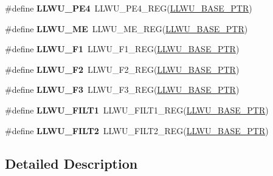 \begin{DoxyCompactItemize}
\mbox{\label{group___l_l_w_u___register___accessor___macros_gada12ddd62f9a667b60702dfd8b4f69ff}} 
\#define {\bfseries L\+L\+W\+U\+\_\+\+P\+E4}~L\+L\+W\+U\+\_\+\+P\+E4\+\_\+\+R\+EG(\hyperlink{group___l_l_w_u___peripheral_ga89c97b9e8756088cb3d8617c022ae6ac}{L\+L\+W\+U\+\_\+\+B\+A\+S\+E\+\_\+\+P\+TR})
\item 
\mbox{\label{group___l_l_w_u___register___accessor___macros_gabe3a2c1d3bd364f60d4ef36944dd0d7e}} 
\#define {\bfseries L\+L\+W\+U\+\_\+\+ME}~L\+L\+W\+U\+\_\+\+M\+E\+\_\+\+R\+EG(\hyperlink{group___l_l_w_u___peripheral_ga89c97b9e8756088cb3d8617c022ae6ac}{L\+L\+W\+U\+\_\+\+B\+A\+S\+E\+\_\+\+P\+TR})
\item 
\mbox{\label{group___l_l_w_u___register___accessor___macros_ga0b1034b705393cb19dc8bdc643242e0b}} 
\#define {\bfseries L\+L\+W\+U\+\_\+\+F1}~L\+L\+W\+U\+\_\+\+F1\+\_\+\+R\+EG(\hyperlink{group___l_l_w_u___peripheral_ga89c97b9e8756088cb3d8617c022ae6ac}{L\+L\+W\+U\+\_\+\+B\+A\+S\+E\+\_\+\+P\+TR})
\item 
\mbox{\label{group___l_l_w_u___register___accessor___macros_gaf234482694d2528fddefe57b14eaa942}} 
\#define {\bfseries L\+L\+W\+U\+\_\+\+F2}~L\+L\+W\+U\+\_\+\+F2\+\_\+\+R\+EG(\hyperlink{group___l_l_w_u___peripheral_ga89c97b9e8756088cb3d8617c022ae6ac}{L\+L\+W\+U\+\_\+\+B\+A\+S\+E\+\_\+\+P\+TR})
\item 
\mbox{\label{group___l_l_w_u___register___accessor___macros_gaaf3f95074e10d498b1522014ab7d5bfe}} 
\#define {\bfseries L\+L\+W\+U\+\_\+\+F3}~L\+L\+W\+U\+\_\+\+F3\+\_\+\+R\+EG(\hyperlink{group___l_l_w_u___peripheral_ga89c97b9e8756088cb3d8617c022ae6ac}{L\+L\+W\+U\+\_\+\+B\+A\+S\+E\+\_\+\+P\+TR})
\item 
\mbox{\label{group___l_l_w_u___register___accessor___macros_ga0ccd44a49b9f822b80e5d8c4935d94fe}} 
\#define {\bfseries L\+L\+W\+U\+\_\+\+F\+I\+L\+T1}~L\+L\+W\+U\+\_\+\+F\+I\+L\+T1\+\_\+\+R\+EG(\hyperlink{group___l_l_w_u___peripheral_ga89c97b9e8756088cb3d8617c022ae6ac}{L\+L\+W\+U\+\_\+\+B\+A\+S\+E\+\_\+\+P\+TR})
\item 
\mbox{\label{group___l_l_w_u___register___accessor___macros_gae5e6484abe7ce06b0e85852c098959e7}} 
\#define {\bfseries L\+L\+W\+U\+\_\+\+F\+I\+L\+T2}~L\+L\+W\+U\+\_\+\+F\+I\+L\+T2\+\_\+\+R\+EG(\hyperlink{group___l_l_w_u___peripheral_ga89c97b9e8756088cb3d8617c022ae6ac}{L\+L\+W\+U\+\_\+\+B\+A\+S\+E\+\_\+\+P\+TR})
\end{DoxyCompactItemize}


\subsection{Detailed Description}
